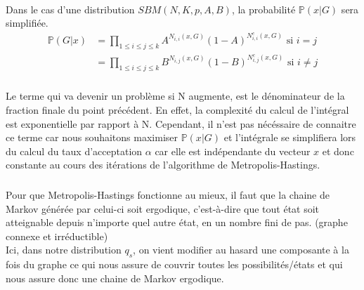 \paragraph*{}
Dans le cas d'une distribution $SBM(N,K,p,A,B)$, la probabilité $\mathbb{P}(x|G)$ sera simplifiée.
\begin{align*}
    \mathbb{P}(G|x) &= \prod_{1 \leq i \leq j \leq k} A^{N_{i,i}(x,G)} (1-A)^{N_{i,i}^c(x,G)}\text{ si }i=j\\
                    &= \prod_{1 \leq i \leq j \leq k} B^{N_{i,j}(x,G)} (1-B)^{N_{i,j}^c(x,G)}\text{ si }i \ne j
\end{align*}
\subsubsection{}
\paragraph*{}
Le terme qui va devenir un problème si N augmente, est le dénominateur de la fraction finale du point précédent. En effet, la complexité du calcul de l'intégral
est exponentielle par rapport à N. Cependant, il n'est pas nécéssaire de connaitre ce terme car nous souhaitons maximiser $\mathbb{P}(x|G)$ et l'intégrale se 
simplifiera lors du calcul du taux d'acceptation $\alpha$ car elle est indépendante du vecteur $x$ et donc constante au cours des itérations de l'algorithme de 
Metropolis-Hastings.
\subsubsection{}
Pour que Metropolis-Hastings fonctionne au mieux, il faut que la chaine de Markov générée par celui-ci soit ergodique, c'est-à-dire que tout état soit atteignable depuis n'importe quel autre état,
en un nombre fini de pas. (graphe connexe et irréductible) \\
Ici, dans notre distribution $q_{s}$, on vient modifier au hasard une composante à la fois du graphe ce qui nous assure de couvrir toutes les possibilités/états et qui nous assure donc une chaine de Markov ergodique.
